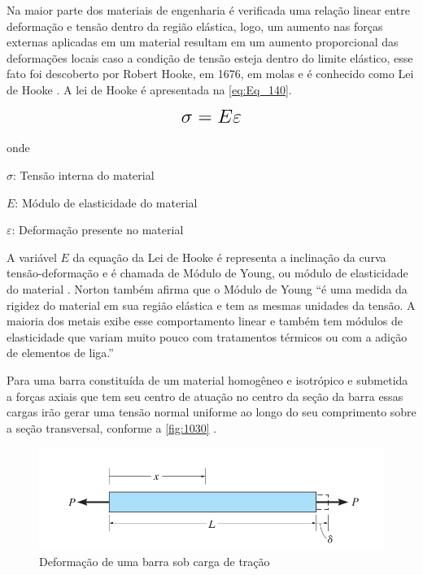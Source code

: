 Na maior parte dos materiais de engenharia é verificada uma relação linear entre deformação e tensão dentro da região elástica, logo, um aumento
nas forças externas aplicadas em um material resultam em um aumento proporcional das deformações locais caso a condição de tensão esteja dentro
do limite elástico, esse fato foi descoberto por Robert Hooke, em 1676, em molas e é conhecido como Lei de Hooke \autocite{Hibbeler2010}.
A lei de Hooke é apresentada na \autoref{eq:Eq_140}.

\begin{equation}\label{eq:Eq_140}%
\mbox{\fontsize{17.28}{21.6}\selectfont\( %
\sigma = E \varepsilon
\)} %
\end{equation}

onde

$\sigma$: Tensão interna do material

$E$: Módulo de elasticidade do material

$\varepsilon$: Deformação presente no material

\hfill

A variável $E$ da equação da Lei de Hooke é representa a inclinação da curva tensão-deformação e é chamada de Módulo de Young, ou módulo de elasticidade do
material \autocite{Norton2011}.
Norton também afirma que o Módulo de Young “é uma medida da rigidez do material em sua região elástica e tem as mesmas unidades da tensão.
A maioria dos metais exibe esse comportamento linear e também tem módulos de elasticidade que variam muito pouco com tratamentos térmicos ou com a adição de elementos de liga.”

Para uma barra constituída de um material homogêneo e isotrópico e submetida a forças axiais que tem seu centro de atuação no centro da seção da barra essas cargas
irão gerar uma tensão normal uniforme ao longo do seu comprimento sobre a seção transversal, conforme a \autoref{fig:1030} \autocite{Hibbeler2010}.

\begin{figure}[htb]
	\caption{\label{fig:1030} Deformação de uma barra sob carga de tração}
	\begin{center}
		\includegraphics[width=\textwidth]{pictures/1030.png}
	\end{center}
\end{figure}

